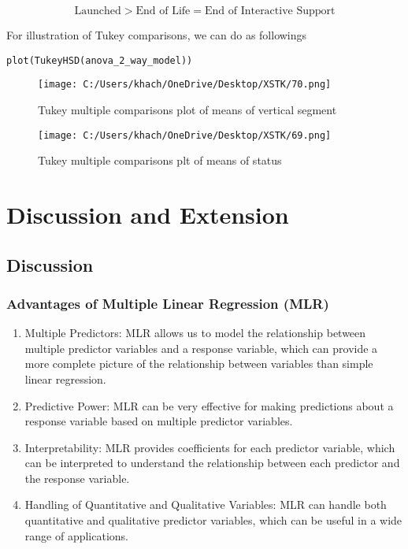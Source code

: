 \documentclass[a4paper]{article}
\begin{document}
\begin{itemize}
	\[
	\text{Launched} > \text{End of Life} = \text{End of Interactive Support}
	\]
	\end{itemize}
	For illustration of Tukey comparisons, we can do as followings
	\begin{lstlisting}[frame=single, backgroundcolor=\color{gray!10}, breaklines=true, columns=fullflexible]
		plot(TukeyHSD(anova_2_way_model))
	\end{lstlisting}
	\begin{figure}[htbp]
		\centering
		\begin{adjustbox}{width=0.7\textwidth, frame}
			\texttt{[image: C:/Users/khach/OneDrive/Desktop/XSTK/70.png]}
		\end{adjustbox}
		\captionsetup{justification=centering}
		\vspace{0.5cm}
		\caption{Tukey multiple comparisons plot of means of vertical segment}
	\end{figure}
		\begin{figure}[htbp]
		\centering
		\begin{adjustbox}{width=0.7\textwidth, frame}
			\texttt{[image: C:/Users/khach/OneDrive/Desktop/XSTK/69.png]}
		\end{adjustbox}
		\captionsetup{justification=centering}
		\vspace{0.5cm}
		\caption{Tukey multiple comparisons plt of means of status}
	\end{figure}
	\section{Discussion and Extension}
	\subsection{Discussion}
	\subsubsection{Advantages of Multiple Linear Regression (MLR)}
	\begin{enumerate}
		\item Multiple Predictors: MLR allows us to model the relationship between multiple predictor variables and a response variable, which can provide a more complete picture of the relationship between variables than simple linear regression.
		
		\item Predictive Power: MLR can be very effective for making predictions about a response variable based on multiple predictor variables.
		
		\item Interpretability: MLR provides coefficients for each predictor variable, which can be interpreted to understand the relationship between each predictor and the response variable.
		
		\item Handling of Quantitative and Qualitative Variables: MLR can handle both quantitative and qualitative predictor variables, which can be useful in a wide range of applications.
	\end{enumerate}
\end{document}
